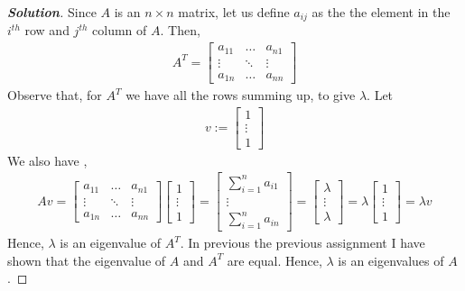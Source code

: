 \documentclass[10pt]{scrartcl}
\theoremstyle{definition}
\newenvironment{solution} {\begin{proof}[\normalfont \textbf{Solution}]} {\end{proof}}
\begin{document}
\begin{solution}
    Since $A$ is an $n \times n$ matrix, let us define $a_{ij}$ as the the element in the $i^{th}$ row and $j^{th}$ column of $A$.
    Then, 
    \begin{gather*}
        A^T=
        \begin{bmatrix}
            a_{11} & \dots & a_{n1} \\
            \vdots & \ddots & \vdots \\
            a_{1n} & \dots & a_{nn} 
        \end{bmatrix} 
    \end{gather*}
    Observe that, for $A^T$ we have all the rows summing up, to give $\lambda$.
    Let 
    \begin{gather*}
        v := 
        \begin{bmatrix}
            1 \\
            \vdots \\
            1 
        \end{bmatrix}
    \end{gather*}
    We also have ,
    \begin{gather*}
        Av =
        \begin{bmatrix}
            a_{11} & \dots & a_{n1} \\
            \vdots & \ddots & \vdots \\
            a_{1n} & \dots & a_{nn} 
        \end{bmatrix} 
        \begin{bmatrix}
            1 \\
            \vdots \\
            1 
        \end{bmatrix}
        =
        \begin{bmatrix}
            \sum_{i = 1}^n a_{i1} \\
            \vdots \\
            \sum_{i = 1}^n a_{in}
        \end{bmatrix}
        =
        \begin{bmatrix}
            \lambda \\
            \vdots \\
            \lambda 
        \end{bmatrix}
        =\lambda
        \begin{bmatrix}
            1 \\
            \vdots \\
            1 
        \end{bmatrix}
        = \lambda v
    \end{gather*}
    Hence, $\lambda$ is an eigenvalue of $A^T$. In previous the previous assignment I have shown that the eigenvalue of $A$ and $A^T$ are equal.
    Hence, $\lambda$ is an eigenvalues of $A$. 
\end{solution}
\end{document}
